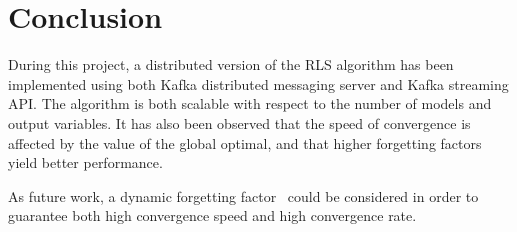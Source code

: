 \chapter{Conclusion}

During this project, a distributed version of the RLS algorithm
has been implemented using both Kafka distributed messaging server
and Kafka streaming API.
The algorithm is both scalable with respect to the number of models
and output variables.
It has also been observed that the speed of convergence is affected
by the value of the global optimal, and that higher forgetting
factors yield better performance.

As future work, a dynamic forgetting factor~\cite{johnstone1982exponential} could be considered
in order to guarantee both high convergence speed and high
convergence rate.
